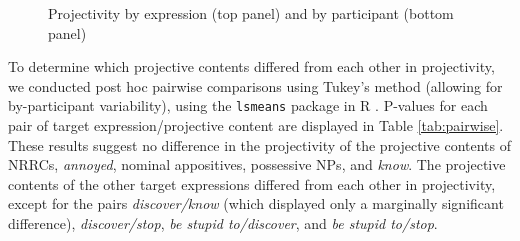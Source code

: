 \documentclass[11pt,fleqn]{article}
\newcommand{\6}{\mbox{$[\hspace*{-.6mm}[$}}
\newcommand{\9}{\mbox{$]\hspace*{-.6mm}]$}}
\newcommand{\tableref}[1]{Table \ref{#1}}
\begin{document}
\begin{figure}[h!]
\centering


	

\caption{Projectivity by expression (top panel) and by participant (bottom panel)}
\label{fig:f-proj-1a}
\end{figure}

To determine which projective contents differed from each other in projectivity, we conducted post hoc pairwise comparisons using Tukey's method (allowing for by-participant variability), using the \verb|lsmeans| package \citep{tukey} in R \citep{r}. P-values for each pair of target expression/projective content are displayed in \tableref{tab:pairwise}. These results suggest no difference in the projectivity of the projective contents of NRRCs, \emph{annoyed}, nominal appositives, possessive NPs, and \emph{know}. The projective contents of the other target expressions differed from each other in projectivity, except for the pairs \emph{discover/know} (which displayed only a marginally significant difference), \emph{discover/stop}, \emph{be stupid to/discover}, and \emph{be stupid to/stop}. 
\end{document}
